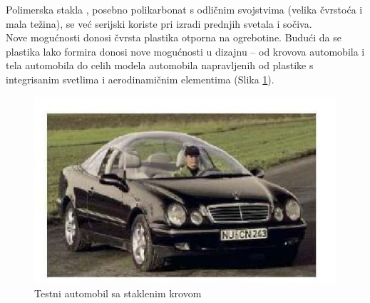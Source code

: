 \documentclass[a4paper]{article}
\begin{document}
{Polimerska stakla \cite{petiLink}, posebno polikarbonat s odličnim svojstvima (velika čvrstoća i mala težina), se već serijski koriste pri izradi prednjih svetala i sočiva. \\

Nove mogućnosti donosi čvrsta plastika otporna na ogrebotine. Budući da se plastika lako formira donosi nove mogućnosti u dizajnu – od krovova automobila i tela automobila do celih modela automobila napravljenih od plastike s integrisanim svetlima i aerodinamičnim elementima (Slika \ref{slika_7}).

\begin{figure}[H]
    \centering
    \includegraphics[width=.5\textwidth]{slika 7.jpg}
    \caption{Testni automobil sa staklenim krovom}
    \label{slika_7}
\end{figure}

\newpage

}
\end{document}
